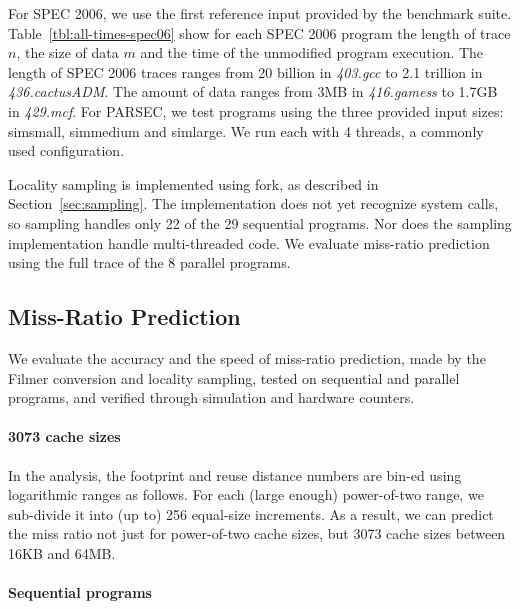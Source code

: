 For SPEC 2006, we use the first reference input provided by the benchmark
suite. Table~\ref{tbl:all-times-spec06} show for each SPEC 2006 program the
length of trace $n$, the size of data $m$ and the time of the
unmodified program execution. The length of SPEC 2006 traces ranges
from 20 billion in \emph{403.gcc} to 2.1 trillion in
\emph{436.cactusADM}.  The amount of data ranges from 3MB in
\emph{416.gamess} to 1.7GB in \emph{429.mcf}.  For PARSEC, we test
programs using the three provided input sizes: simsmall, simmedium and
simlarge.  We run each with 4 threads, a commonly used configuration.

Locality sampling is implemented using fork, as described in
Section~\ref{sec:sampling}.  The implementation does not yet recognize
system calls, so sampling handles only 22 of the 29 sequential
programs.  Nor does the sampling implementation handle multi-threaded
code.  We evaluate miss-ratio prediction using the full trace of the 8
 parallel programs.

\subsection{Miss-Ratio Prediction}
\label{sec:mr-eval}

We evaluate the accuracy and the speed of miss-ratio prediction,
made by the Filmer conversion and locality sampling, tested on
sequential and parallel programs, and verified through simulation and
hardware counters.

\paragraph{3073 cache sizes}
In the analysis, the footprint and reuse distance numbers are bin-ed
using logarithmic ranges as follows.  For each (large enough)
power-of-two range, we sub-divide it into (up to) 256 equal-size
increments.  As a result, we can predict the miss ratio not just for
power-of-two cache sizes, but 3073 cache sizes between 16KB and 64MB.

\paragraph{Sequential programs}

